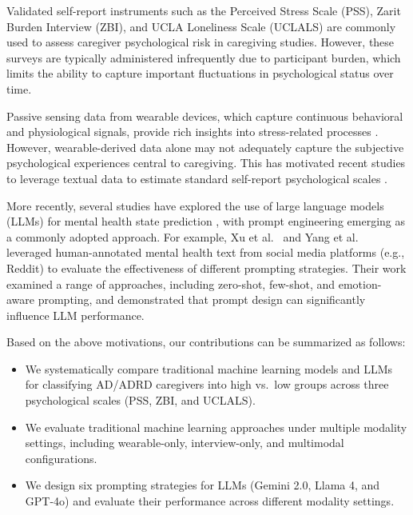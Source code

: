 \documentclass[letterpaper, 10 pt, conference]{ieeeconf}  %
\begin{document}
Validated self-report instruments such as the Perceived Stress Scale (PSS)\cite{pss}, Zarit Burden Interview (ZBI)\cite{ZBI}, and UCLA Loneliness Scale (UCLALS)\cite{ucla} are commonly used to assess caregiver psychological risk in caregiving studies. However, these surveys are typically administered infrequently due to participant burden\cite{surveyburden}, which limits the ability to capture important fluctuations in psychological status over time. 

Passive sensing data from wearable devices, which capture continuous behavioral and physiological signals, provide rich insights into stress-related processes \cite{smets2018large}. However, wearable-derived data alone may not adequately capture the subjective psychological experiences central to caregiving. This has motivated recent studies to leverage textual data to estimate standard self-report psychological scales \cite{textwellbeing}.

More recently, several studies have explored the use of large language models (LLMs) for mental health state prediction \cite{xu2024mental,yang2023towards,lamichhane2023evaluation}, with prompt engineering emerging as a commonly adopted approach. For example, Xu et al.~\cite{xu2024mental} and Yang et al.~\cite{yang2023towards} leveraged human-annotated mental health text from social media platforms (e.g., Reddit) to evaluate the effectiveness of different prompting strategies. Their work examined a range of approaches, including zero-shot, few-shot, and emotion-aware prompting, and demonstrated that prompt design can significantly influence LLM performance.


Based on the above motivations, our contributions can be summarized as follows:
\begin{itemize}
\item We systematically compare traditional machine learning models and LLMs for classifying AD/ADRD caregivers into high vs.\ low groups across three psychological scales (PSS, ZBI, and UCLALS).

\item We evaluate traditional machine learning approaches under multiple modality settings, including wearable-only, interview-only, and multimodal configurations.

\item We design six prompting strategies for LLMs (Gemini 2.0, Llama 4, and GPT-4o) and evaluate their performance across different modality settings.

\end{itemize}
\end{document}
